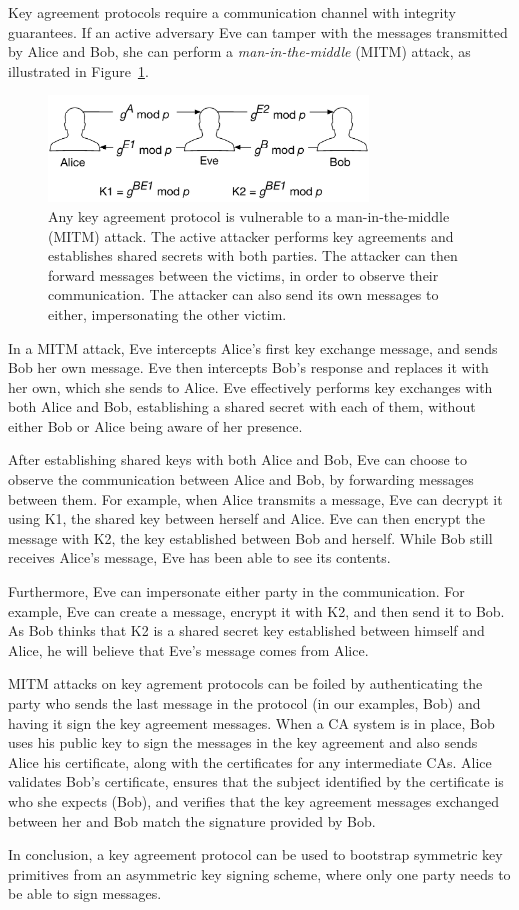 Key agreement protocols require a communication channel with integrity
guarantees. If an active adversary Eve can tamper with the messages transmitted
by Alice and Bob, she can perform a \textit{man-in-the-middle} (MITM) attack,
as illustrated in Figure~\ref{fig:key_agreement_mitm}.

\begin{figure}[hbt]
  \centering
  \includegraphics[width=85mm]{figures/key_agreement_mitm.pdf}
  \caption{
    Any key agreement protocol is vulnerable to a man-in-the-middle (MITM)
    attack. The active attacker performs key agreements and establishes shared
    secrets with both parties. The attacker can then forward messages between
    the victims, in order to observe their communication. The attacker can also
    send its own messages to either, impersonating the other victim.
  }
  \label{fig:key_agreement_mitm}
\end{figure}

In a MITM attack, Eve intercepts Alice's first key exchange message, and sends
Bob her own message. Eve then intercepts Bob's response and replaces it with
her own, which she sends to Alice. Eve effectively performs key exchanges with
both Alice and Bob, establishing a shared secret with each of them, without
either Bob or Alice being aware of her presence.

After establishing shared keys with both Alice and Bob, Eve can choose to
observe the communication between Alice and Bob, by forwarding messages between
them. For example, when Alice transmits a message, Eve can decrypt it using K1,
the shared key between herself and Alice. Eve can then encrypt the message with
K2, the key established between Bob and herself. While Bob still receives
Alice's message, Eve has been able to see its contents.

Furthermore, Eve can impersonate either party in the communication. For
example, Eve can create a message, encrypt it with K2, and then send it to Bob.
As Bob thinks that K2 is a shared secret key established between himself and
Alice, he will believe that Eve's message comes from Alice.

MITM attacks on key agrement protocols can be foiled by authenticating the
party who sends the last message in the protocol (in our examples, Bob) and
having it sign the key agreement messages. When a CA system is in place, Bob
uses his public key to sign the messages in the key agreement and also sends
Alice his certificate, along with the certificates for any intermediate CAs.
Alice validates Bob's certificate, ensures that the subject identified by the
certificate is who she expects (Bob), and verifies that the key agreement
messages exchanged between her and Bob match the signature provided by Bob.

In conclusion, a key agreement protocol can be used to bootstrap symmetric key
primitives from an asymmetric key signing scheme, where only one party needs to
be able to sign messages.


